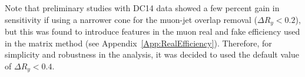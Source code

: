 Note that preliminary studies with DC14 data showed a few percent gain in sensitivity if using a narrower cone for the muon-jet overlap removal ($\Delta R_y<0.2$), 
but this was found to introduce features in the muon real and fake efficiency used in the matrix method (see Appendix~\ref{App:RealEfficiency}). 
Therefore, for simplicity and robustness in the analysis, it was decided to used the default value of $\Delta R_y<0.4$. 


%
% 
%


